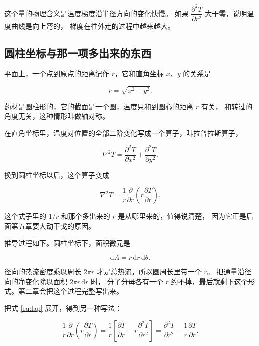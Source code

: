 这个量的物理含义是温度梯度沿半径方向的变化快慢。
如果 $\dfrac{\partial^2 T}{\partial r^2}$ 大于零，说明温度曲线是向上弯的，
梯度在往外走的过程中越来越大。

\subsection{圆柱坐标与那一项多出来的东西}

平面上，一个点到原点的距离记作 $r$，它和直角坐标 $x$、$y$ 的关系是

\begin{equation}
r = \sqrt{x^2+y^2}.
\end{equation}

药材是圆柱形的，它的截面是一个圆，温度只和到圆心的距离 $r$ 有关，
和转过的角度无关，这种情形叫做轴对称。

在直角坐标里，温度对位置的全部二阶变化写成一个算子，叫拉普拉斯算子，

\begin{equation}
\nabla^2 T = \frac{\partial^2 T}{\partial x^2}+\frac{\partial^2 T}{\partial y^2}.
\end{equation}

换到圆柱坐标以后，这个算子变成

\begin{equation}
\nabla^2 T = \frac{1}{r}\frac{\partial}{\partial r}\left(r\frac{\partial T}{\partial r}\right).
\label{eq:lap}
\end{equation}

这个式子里的 $1/r$ 和那个多出来的 $r$ 是从哪里来的，值得说清楚，
因为它正是后面第五章要大动干戈的原因。

推导过程如下。圆柱坐标下，面积微元是

\begin{equation}
\mathrm{d}A = r\,\mathrm{d}r\,\mathrm{d}\theta .
\end{equation}

径向的热流密度乘以周长 $2\pi r$ 才是总热流，所以圆周长里带一个 $r$。
把通量沿径向的净变化除以面积 $2\pi r\,\mathrm{d}r$ 时，
分子分母各有一个 $r$ 约不掉，最后就剩下这个形式。第二章会把这个过程完整写出来。

把式 \eqref{eq:lap} 展开，得到另一种写法：

\begin{equation}
\frac{1}{r}\frac{\partial}{\partial r}\left(r\frac{\partial T}{\partial r}\right)
= \frac{1}{r}\left[\frac{\partial T}{\partial r} + r\frac{\partial^2 T}{\partial r^2}\right]
= \frac{\partial^2 T}{\partial r^2} + \frac{1}{r}\frac{\partial T}{\partial r}.
\label{eq:lap-expand}
\end{equation}

